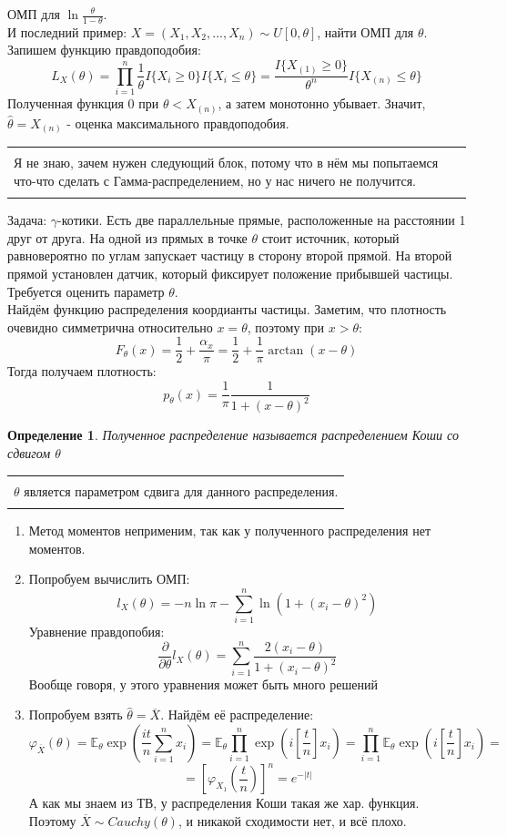 \documentclass[a4paper,12pt]{article}
\newcommand{\expec}{\mathbb{E}}
\newcommand{\orst}[2]{#1_{(#2)}}
\newcommand{\sumin}{\sum\limits_{i=1}^n}
\newcommand{\prodin}{\prod\limits_{i=1}^n}
\newcommand{\sample}{X_1, X_2, ..., X_n}
\newcommand{\derb}[1]{\frac{\partial}{\partial #1}}
\newenvironment{annotation}{\begin{center}
    \begin{tabular}{|p{0.9\textwidth}|}
    \hline\\
}
{ 
    \\\\\hline
    \end{tabular} 
    \end{center}
}
\newtheorem{dfn}{Определение}[section]
\theoremstyle{named}
\begin{document}
ОМП для $\ln \frac{\theta}{1-\theta}$. \\
И последний пример: $X = (\sample) \sim U[0, \theta]$, найти ОМП для $\theta$. Запишем функцию правдоподобия:
$$
    L_X(\theta) = \prodin \frac{1}{\theta} I\{ X_i \geq 0\}I\{ X_i \leq \theta \} = \frac{I\{\orst{X}{1}\geq 0 \}}{\theta^n} I \{\orst{X}{n}\leq \theta \} 
$$
Полученная функция $0$ при $\theta < \orst{X}{n}$, а затем монотонно убывает. Значит, $\hat\theta = \orst{X}{n}$ - оценка максимального 
правдоподобия. \\ 
\begin{annotation}
    Я не знаю, зачем нужен следующий блок, потому что в нём мы попытаемся что-что сделать с Гамма-распределением, но у нас ничего не получится.
\end{annotation}
Задача: $\gamma$-котики. Есть две параллельные прямые, расположенные на расстоянии 1 друг от друга. На одной из прямых в точке $\theta$ стоит источник, 
который равновероятно по углам запускает частицу в сторону второй прямой. На второй прямой установлен датчик, который фиксирует положение прибывшей 
частицы. Требуется оценить параметр $\theta$. \\
Найдём функцию распределения коордианты частицы. Заметим, что плотность очевидно симметрична относительно $x = \theta$, поэтому при $x > \theta$: 
$$
    F_\theta(x) = \frac{1}{2} + \frac{\alpha_x}{\pi} = \frac{1}{2} + \frac{1}{\pi}\arctan(x-\theta)
$$
Тогда получаем плотность:
$$
    p_\theta(x) = \frac{1}{\pi} \frac{1}{1 + (x-\theta)^2}
$$
\begin{dfn}
    Полученное распределение называется распределением Коши со сдвигом $\theta$
\end{dfn}
\begin{annotation}
    $\theta$ является параметром сдвига для данного распределения. 
\end{annotation}
\begin{enumerate}
    \item Метод моментов неприменим, так как у полученного распределения нет моментов. 
    \item Попробуем вычислить ОМП:
    $$
        l_X(\theta) = -n \ln \pi - \sumin \ln\left(1 + (x_i - \theta)^2\right)
    $$  
    Уравнение правдопобия:
    $$
        \derb{\theta} l_X(\theta) = \sumin \frac{2(x_i - \theta)}{1 + (x_i - \theta)^2}
    $$
    Вообще говоря, у этого уравнения может быть много решений
    \item Попробуем взять $\hat\theta = \overline{X}$. Найдём её распределение:
    $$
        \varphi_{\overline{X}}(\theta) = \expec_\theta \exp\left(\frac{it}{n}\sumin x_i \right) = 
        \expec_\theta \prodin \exp\left(i\left[\frac{t}{n}\right]x_i\right) = \prodin \expec_\theta \exp\left(i\left[\frac{t}{n}\right]x_i\right) =
        $$
        $$
        =\left[\varphi_{X_1}\left(\frac{t}{n}\right)\right]^n = e^{-|t|}
    $$
    А как мы знаем из ТВ, у распределения Коши такая же хар. функция. Поэтому $\overline{X} \sim Cauchy(\theta)$, 
    и никакой сходимости нет, и всё плохо. 
\end{enumerate}
\end{document}
